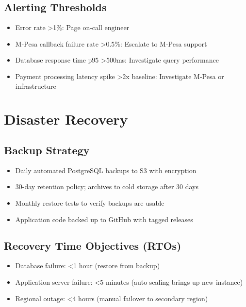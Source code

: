 \documentclass[12pt, a4paper, twoside, openright]{report}
\begin{document}
\subsection{Alerting Thresholds}

\begin{itemize}
    \item Error rate \textgreater 1\%: Page on-call engineer
    \item M-Pesa callback failure rate \textgreater 0.5\%: Escalate to M-Pesa support
    \item Database response time p95 \textgreater 500ms: Investigate query performance
    \item Payment processing latency spike \textgreater 2x baseline: Investigate M-Pesa or infrastructure
\end{itemize}

\section{Disaster Recovery}

\subsection{Backup Strategy}

\begin{itemize}
    \item Daily automated PostgreSQL backups to S3 with encryption
    \item 30-day retention policy; archives to cold storage after 30 days
    \item Monthly restore tests to verify backups are usable
    \item Application code backed up to GitHub with tagged releases
\end{itemize}

\subsection{Recovery Time Objectives (RTOs)}

\begin{itemize}
    \item Database failure: \textless{}1 hour (restore from backup)
    \item Application server failure: \textless{}5 minutes (auto-scaling brings up new instance)
    \item Regional outage: \textless{}4 hours (manual failover to secondary region)
\end{itemize}
\end{document}

